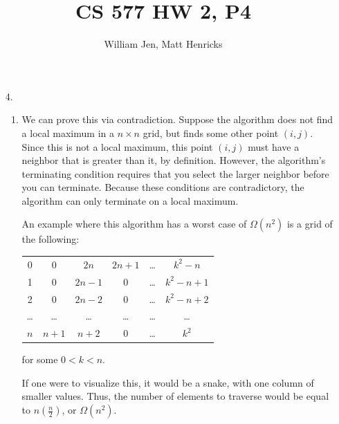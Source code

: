 \documentclass{article}
\title{CS 577 HW 2, P4}
\author{William Jen, Matt Henricks}
\date{}
\begin{document}
\maketitle

\begin{enumerate}
    \item[4.]
        \begin{enumerate}
            \item
                We can prove this via contradiction. Suppose the algorithm does not find
                a local maximum in a $n\times n$ grid, but finds some other point $\left(i, j\right)$.
                Since this is not a local maximum, this point $\left(i, j\right)$ must have a neighbor that is greater than it, by definition.
                However, the algorithm's terminating condition requires that you select the larger neighbor
                before you can terminate. Because these conditions are contradictory, the algorithm 
                can only terminate on a local maximum.
                
                
                An example where this algorithm has a worst case of $\Omega\left(n^2\right)$ is
                a grid of the following:
                
                \begin{tabular}{c c c c c c}
                      0      & 0 & $2n$ & $2n+1$ &\ldots & $k^2-n$  \\
                      1      & 0 & $2n-1$ & 0 & \ldots & $k^2-n+1$ \\
                      2      & 0 & $2n-2$ & 0 & \ldots & $k^2-n+2$ \\
                      \ldots & \ldots & \ldots & \ldots & \ldots & \ldots \\
                      $n$ & $n+1$ & $n+2$ & 0 & \ldots & $k^2$
                \end{tabular}
                for some $0 < k < n$.
                
                If one were to visualize this, it would be a snake, with one column of smaller values.
                Thus, the number of elements to traverse would be equal to $n\left(\frac{n}{2}\right)$, 
                or $\Omega\left(n^2\right)$.
                

\end{enumerate}
\end{enumerate}
\end{document}
